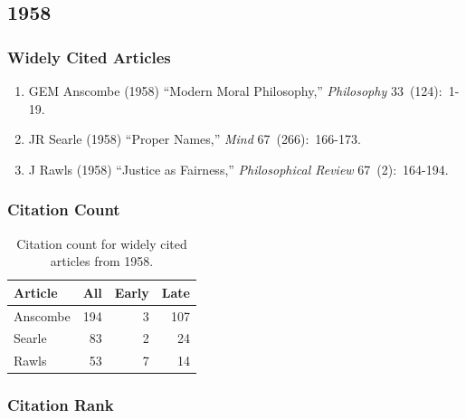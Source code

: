 \documentclass[
  10pt,
  letterpaper,
  DIV=11,
  numbers=noendperiod,
  twoside]{scrartcl}
\providecommand{\tightlist}{%
  \setlength{\itemsep}{0pt}\setlength{\parskip}{0pt}}\usepackage{longtable,booktabs,array}
\begin{document}
\newpage

\subsection{1958}\label{sec-s1958}

\subsubsection*{Widely Cited Articles}\label{widely-cited-articles-2}

\begin{enumerate}
\def\labelenumi{\arabic{enumi}.}
\tightlist
\item
  GEM Anscombe (1958) ``Modern Moral Philosophy,'' \emph{Philosophy}
  33~(124):~1-19.
\item
  JR Searle (1958) ``Proper Names,'' \emph{Mind} 67~(266):~166-173.
\item
  J Rawls (1958) ``Justice as Fairness,'' \emph{Philosophical Review}
  67~(2):~164-194.
\end{enumerate}

\subsubsection*{Citation Count}\label{sec-count-1958}

\begin{longtable}[]{@{}lrrr@{}}

\caption{\label{tbl-citation-count-1958}Citation count for widely cited
articles from 1958.}

\tabularnewline

\toprule\noalign{}
Article & All & Early & Late \\
\midrule\noalign{}
\endhead
\bottomrule\noalign{}
\endlastfoot
Anscombe & 194 & 3 & 107 \\
Searle & 83 & 2 & 24 \\
Rawls & 53 & 7 & 14 \\

\end{longtable}

\subsubsection*{Citation Rank}\label{sec-rank-1958}
\end{document}
